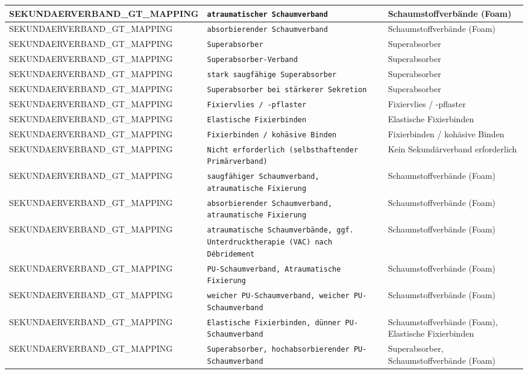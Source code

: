 \begin{longtable}{|p{3.5cm}|p{5cm}|p{6.5cm}|}
SEKUNDAERVERBAND\_GT\_MAPPING & \texttt{atraumatischer Schaumverband} & Schaumstoffverbände (Foam) \\ \hline
SEKUNDAERVERBAND\_GT\_MAPPING & \texttt{absorbierender Schaumverband} & Schaumstoffverbände (Foam) \\ \hline
SEKUNDAERVERBAND\_GT\_MAPPING & \texttt{Superabsorber} & Superabsorber \\ \hline
SEKUNDAERVERBAND\_GT\_MAPPING & \texttt{Superabsorber-Verband} & Superabsorber \\ \hline
SEKUNDAERVERBAND\_GT\_MAPPING & \texttt{stark saugfähige Superabsorber} & Superabsorber \\ \hline
SEKUNDAERVERBAND\_GT\_MAPPING & \texttt{Superabsorber bei stärkerer Sekretion} & Superabsorber \\ \hline
SEKUNDAERVERBAND\_GT\_MAPPING & \texttt{Fixiervlies / -pflaster} & Fixiervlies / -pflaster \\ \hline
SEKUNDAERVERBAND\_GT\_MAPPING & \texttt{Elastische Fixierbinden} & Elastische Fixierbinden \\ \hline
SEKUNDAERVERBAND\_GT\_MAPPING & \texttt{Fixierbinden / kohäsive Binden} & Fixierbinden / kohäsive Binden \\ \hline
SEKUNDAERVERBAND\_GT\_MAPPING & \texttt{Nicht erforderlich (selbsthaftender Primärverband)} & Kein Sekundärverband erforderlich \\ \hline
SEKUNDAERVERBAND\_GT\_MAPPING & \texttt{saugfähiger Schaumverband, atraumatische Fixierung} & Schaumstoffverbände (Foam) \\ \hline
SEKUNDAERVERBAND\_GT\_MAPPING & \texttt{absorbierender Schaumverband, atraumatische Fixierung} & Schaumstoffverbände (Foam) \\ \hline
SEKUNDAERVERBAND\_GT\_MAPPING & \texttt{atraumatische Schaumverbände, ggf. Unterdrucktherapie (VAC) nach Débridement} & Schaumstoffverbände (Foam) \\ \hline
SEKUNDAERVERBAND\_GT\_MAPPING & \texttt{PU-Schaumverband, Atraumatische Fixierung} & Schaumstoffverbände (Foam) \\ \hline
SEKUNDAERVERBAND\_GT\_MAPPING & \texttt{weicher PU-Schaumverband, weicher PU-Schaumverband} & Schaumstoffverbände (Foam) \\ \hline
SEKUNDAERVERBAND\_GT\_MAPPING & \texttt{Elastische Fixierbinden, dünner PU-Schaumverband} & Schaumstoffverbände (Foam), Elastische Fixierbinden \\ \hline
SEKUNDAERVERBAND\_GT\_MAPPING & \texttt{Superabsorber, hochabsorbierender PU-Schaumverband} & Superabsorber, Schaumstoffverbände (Foam) \\ \hline

\end{longtable}
